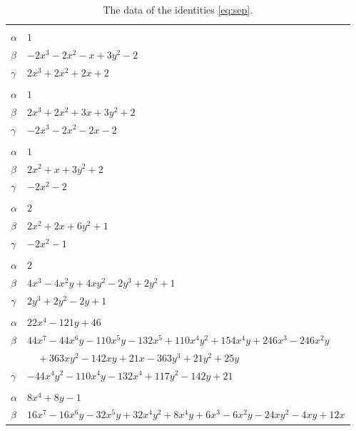 \documentclass[11pt]{article}
\begin{document}
\begingroup\footnotesize
\setlength{\LTcapwidth}{\textwidth}
\begin{longtable}{@{}ll@{}}
\caption{The data of the identities \eqref{eq:sep}.}\label{tab:sep}\\
\hline\endfirsthead\hline\endhead\hline\endfoot
\multicolumn{2}{@{}l}{$\{i,j\}=\{0,4\}$, $k_{ij}=3$}\\
$\alpha$ & $1$\\
$\beta$ & $-2x^{3}-2x^{2}-x+3y^{2}-2$\\
$\gamma$ & $2x^{3}+2x^{2}+2x+2$\\
\addlinespace[3pt]
\multicolumn{2}{@{}l}{$\{i,j\}=\{0,5\}$, $k_{ij}=3$}\\
$\alpha$ & $1$\\
$\beta$ & $2x^{3}+2x^{2}+3x+3y^{2}+2$\\
$\gamma$ & $-2x^{3}-2x^{2}-2x-2$\\
\addlinespace[3pt]
\multicolumn{2}{@{}l}{$\{i,j\}=\{0,6\}$, $k_{ij}=3$}\\
$\alpha$ & $1$\\
$\beta$ & $2x^{2}+x+3y^{2}+2$\\
$\gamma$ & $-2x^{2}-2$\\
\addlinespace[3pt]
\multicolumn{2}{@{}l}{$\{i,j\}=\{0,9\}$, $k_{ij}=3$}\\
$\alpha$ & $2$\\
$\beta$ & $2x^{2}+2x+6y^{2}+1$\\
$\gamma$ & $-2x^{2}-1$\\
\addlinespace[3pt]
\multicolumn{2}{@{}l}{$\{i,j\}=\{1,5\}$, $k_{ij}=1$}\\
$\alpha$ & $2$\\
$\beta$ & $4x^{3}-4x^{2}y+4xy^{2}-2y^{3}+2y^{2}+1$\\
$\gamma$ & $2y^{3}+2y^{2}-2y+1$\\
\addlinespace[3pt]
\multicolumn{2}{@{}l}{$\{i,j\}=\{1,6\}$, $k_{ij}=5^{2}$}\\
$\alpha$ & $22x^{4}-121y+46$\\
$\beta$ & $44x^{7}-44x^{6}y-110x^{5}y-132x^{5}+110x^{4}y^{2}+154x^{4}y+246x^{3}-246x^{2}y$\\
 & $\quad +363xy^{2}-142xy+21x-363y^{3}+21y^{2}+25y$\\
$\gamma$ & $-44x^{4}y^{2}-110x^{4}y-132x^{4}+117y^{2}-142y+21$\\
\addlinespace[3pt]
\multicolumn{2}{@{}l}{$\{i,j\}=\{1,7\}$, $k_{ij}=5$}\\
$\alpha$ & $8x^{4}+8y-1$\\
$\beta$ & $16x^{7}-16x^{6}y-32x^{5}y+32x^{4}y^{2}+8x^{4}y+6x^{3}-6x^{2}y-24xy^{2}-4xy+12x$\\

\end{longtable}
\end{document}

